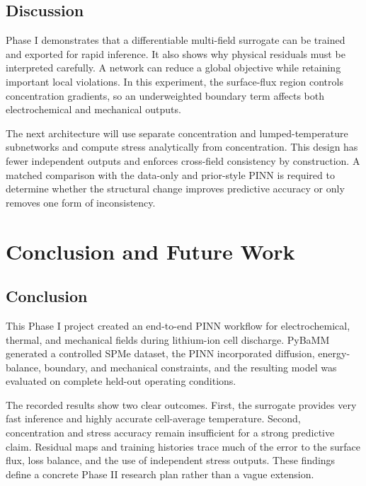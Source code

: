 \documentclass[14pt,a4paper,oneside]{extreport}
\begin{document}
\section{Discussion}
Phase I demonstrates that a differentiable multi-field surrogate can be trained and exported for rapid inference. It also shows why physical residuals must be interpreted carefully. A network can reduce a global objective while retaining important local violations. In this experiment, the surface-flux region controls concentration gradients, so an underweighted boundary term affects both electrochemical and mechanical outputs.

The next architecture will use separate concentration and lumped-temperature subnetworks and compute stress analytically from concentration. This design has fewer independent outputs and enforces cross-field consistency by construction. A matched comparison with the data-only and prior-style PINN is required to determine whether the structural change improves predictive accuracy or only removes one form of inconsistency.

\chapter{Conclusion and Future Work}
\section{Conclusion}
This Phase I project created an end-to-end PINN workflow for electrochemical, thermal, and mechanical fields during lithium-ion cell discharge. PyBaMM generated a controlled SPMe dataset, the PINN incorporated diffusion, energy-balance, boundary, and mechanical constraints, and the resulting model was evaluated on complete held-out operating conditions.

The recorded results show two clear outcomes. First, the surrogate provides very fast inference and highly accurate cell-average temperature. Second, concentration and stress accuracy remain insufficient for a strong predictive claim. Residual maps and training histories trace much of the error to the surface flux, loss balance, and the use of independent stress outputs. These findings define a concrete Phase II research plan rather than a vague extension.
\end{document}
